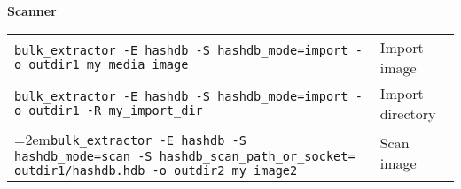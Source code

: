 \begin{footnotesize}
\begin{tabular}{p{3.6 in} p{4 in}}
\end{tabular}
\\
\\
\textbf{\bulk Scanner}\\
\begin{tabular}{p{5.6 in} p{2 in}}
\texttt{bulk\_extractor -E hashdb -S hashdb\_mode=import -o outdir1 my\_media\_image} & Import image\\
\texttt{bulk\_extractor -E hashdb -S hashdb\_mode=import -o outdir1 -R my\_import\_dir} & Import directory\\
\hangindent=2em\texttt{bulk\_extractor -E hashdb -S hashdb\_mode=scan -S hashdb\_scan\_path\_or\_socket= outdir1/hashdb.hdb -o outdir2 my\_image2} & Scan image\\
\end{tabular}
\end{footnotesize}

